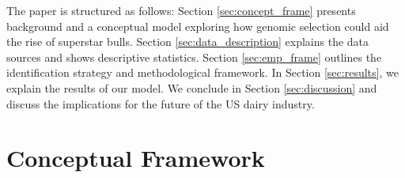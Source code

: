 \documentclass[12pt,letterpaper]{article}
\begin{document}


The paper is structured as follows: Section \ref{sec:concept_frame} presents background and a conceptual model exploring how genomic selection could aid the rise of superstar bulls. Section \ref{sec:data_description} explains the data sources and shows descriptive statistics. Section \ref{sec:emp_frame} outlines the identification strategy and methodological framework. In Section \ref{sec:results}, we explain the results of our model. We conclude in Section \ref{sec:discussion} and discuss the implications for the future of the US dairy industry.

\section{Conceptual Framework\label{sec:concept_frame}}
\end{document}
